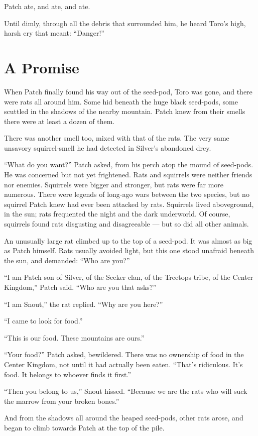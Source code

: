 \documentclass[12pt]{memoir}
\begin{document}
Patch ate, and ate, and ate.

Until dimly, through all the debris that surrounded him, he heard
Toro’s high, harsh cry that meant: “Danger!”


\section{A Promise}

When Patch finally found his way out of the seed-pod, Toro was gone,
and there were rats all around him. Some hid beneath the huge black
seed-pods, some scuttled in the shadows of the nearby mountain. Patch
knew from their smells there were at least a dozen of them.

There was another smell too, mixed with that of the rats. The very
same unsavory squirrel-smell he had detected in Silver’s abandoned
drey.

“What do you want?” Patch asked, from his perch atop the mound of
seed-pods. He was concerned but not yet frightened. Rats and squirrels
were neither friends nor enemies. Squirrels were bigger and stronger,
but rats were far more numerous. There were legends of long-ago wars
between the two species, but no squirrel Patch knew had ever been
attacked by rats. Squirrels lived aboveground, in the sun; rats
frequented the night and the dark underworld. Of course, squirrels
found rats disgusting and disagreeable — but so did all other animals.

An unusually large rat climbed up to the top of a seed-pod. It was
almost as big as Patch himself. Rats usually avoided light, but this
one stood unafraid beneath the sun, and demanded: “Who are you?”

“I am Patch son of Silver, of the Seeker clan, of the Treetops tribe,
of the Center Kingdom,” Patch said. “Who are you that asks?”

“I am Snout,” the rat replied. “Why are you here?”

“I came to look for food.”

“This is our food. These mountains are ours.”

“Your food?” Patch asked, bewildered. There was no ownership of food
in the Center Kingdom, not until it had actually been eaten. “That’s
ridiculous. It’s food. It belongs to whoever finds it first.”

“Then you belong to us,” Snout hissed. “Because we are the rats who
will suck the marrow from your broken bones.”

And from the shadows all around the heaped seed-pods, other rats
arose, and began to climb towards Patch at the top of the pile.
\end{document}
